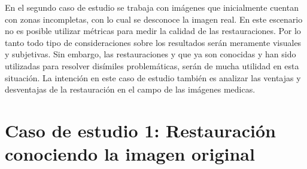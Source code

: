 En el segundo caso de estudio se trabaja con im\'agenes que inicialmente cuentan con zonas incompletas, con lo cual se desconoce la imagen real. En este escenario no es posible utilizar m\'etricas para medir la calidad de las restauraciones. Por lo tanto todo tipo de consideraciones sobre los resultados ser\'an meramente visuales y subjetivas. Sin embargo, las restauraciones \TELEA y \NS que ya son conocidas y han sido utilizadas para resolver dis\'imiles problem\'aticas, ser\'an de mucha utilidad en esta situaci\'on. La intenci\'on en este caso de estudio tambi\'en es analizar las ventajas y desventajas de la restauraci\'on \SOP en el campo de las  im\'agenes medicas.

\section{Caso de estudio 1: Restauraci\'on conociendo la imagen original}

